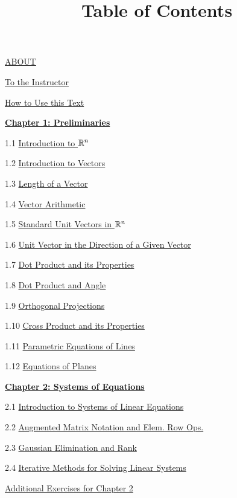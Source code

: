 \documentclass{ximera}
\title{Table of Contents} \license{CC BY-NC-SA 4.0}
\begin{document}
\begin{abstract}
\end{abstract}
\maketitle
	
\href{\xmbaseurl/ABOUT/main}{ABOUT}
	
\href{\xmbaseurl/toInstructor/main}{To the Instructor}
	
\href{\xmbaseurl/HowToUse/main}{How to Use this Text}
	
\href{\xmbaseurl/XLAChapter_prelim/main}{\textbf{Chapter 1: Preliminaries}}
	
1.1	\href{\xmbaseurl/RRN-0010/main}{Introduction to $\mathbb{R}^n$}
	
1.2	\href{\xmbaseurl/VEC-0010/main}{Introduction to Vectors}
	
1.3	\href{\xmbaseurl/VEC-0020/main}{Length of a Vector}
	
1.4	\href{\xmbaseurl/VEC-0030/main}{Vector Arithmetic}
	
1.5	\href{\xmbaseurl/VEC-0035/main}{Standard Unit Vectors in $\mathbb{R}^n$}
	
1.6	\href{\xmbaseurl/VEC-0036/main}{Unit Vector in the Direction of a Given Vector}
	
1.7	\href{\xmbaseurl/VEC-0050/main}{Dot Product and its Properties}
	
1.8	\href{\xmbaseurl/VEC-0060/main}{Dot Product and Angle }
	
1.9	\href{\xmbaseurl/VEC-0070/main}{Orthogonal Projections}
	
1.10	\href{\xmbaseurl/VEC-0080/main}{Cross Product and its Properties}
	
1.11	\href{\xmbaseurl/RRN-0020/main}{Parametric Equations of Lines}
	
1.12	\href{\xmbaseurl/RRN-0030/main}{Equations of Planes}
	
\href{\xmbaseurl/XLAChapter_systems/main}{\textbf{Chapter 2: Systems of Equations}}
	
2.1	\href{\xmbaseurl/SYS-0020/main}{Introduction to Systems of Linear Equations}
	
2.2	\href{\xmbaseurl/SYS-0030/main}{Augmented Matrix Notation and Elem. Row Ops.}
	
2.3	\href{\xmbaseurl/SYS-0030/main}{Gaussian Elimination and Rank}
	
2.4	\href{\xmbaseurl/SYS-0040/main}{Iterative Methods for Solving Linear Systems}
	
\href{\xmbaseurl/SUPX-0020/main}{Additional Exercises for Chapter 2}
	
\end{document}
